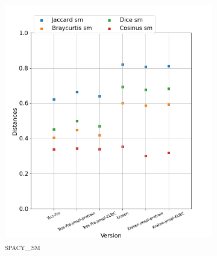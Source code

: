 \begin{figure}[H]
\begin{minipage}{6cm}
\begin{subfigure}{0.89\textwidth}
  \label{fig: }
  \end{subfigure}
  \end{minipage}
  \begin{minipage}{6cm}
  \begin{subfigure}{0.89\textwidth}
  \includegraphics[width=.89\textwidth]{IMAGES/ELTeC_DISTANCES_spaCy3.5.1/MAUPASSANT-graph-dist-spaCy3.5.1-sm.png} 
  \caption{\textsc{spacy\_sm}}
  \label{fig:}
  \end{subfigure}
    \end{minipage}
  \begin{minipage}{6cm}
  \begin{subfigure}{0.89\textwidth}

\end{subfigure}
\end{minipage}
\end{figure}
